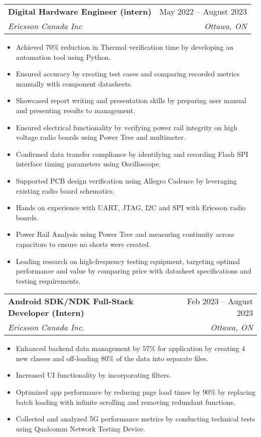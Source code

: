 \documentclass[A4,10pt]{article}
\makeatletter
\newcommand{\resumeItem}[1]{
  \item\small{
    {#1 \vspace{-2pt}}
  }
}
\newcommand{\resumeSubheading}[4]{
  \vspace{-2pt}\item
    \begin{tabular*}{0.97\textwidth}[t]{l@{\extracolsep{\fill}}r}
      \textbf{#1} & #2 \\
      \textit{\small#3} & \textit{\small #4} \\
    \end{tabular*}\vspace{-7pt}
}
\newcommand{\resumeSubSubheading}[2]{
    \item
    \begin{tabular*}{0.97\textwidth}{l@{\extracolsep{\fill}}r}
      \textit{\small#1} & \textit{\small #2} \\
    \end{tabular*}\vspace{-7pt}
}
\newcommand{\resumeSubHeadingListEnd}{\end{itemize}}
\newcommand{\resumeItemListStart}{\begin{itemize}}
\newcommand{\resumeItemListEnd}{\end{itemize}\vspace{-5pt}}
\makeatother
\begin{document}
    \resumeSubheading
      {Digital Hardware Engineer (intern)}{May 2022 -- August 2023}
      {Ericsson Canada Inc}{Ottawa, ON}
      \resumeItemListStart
        \resumeItem{Achieved 70\% reduction in Thermal verification time by developing an automation tool using Python.}
        \resumeItem{Ensured accuracy by creating test cases and comparing recorded metrics manually with component datasheets.}
        \resumeItem{Showcased report writing and presentation skills by preparing user manual and presenting results to management.}
        \resumeItem{Ensured electrical functionality by verifying power rail integrity on high voltage radio boards using Power Tree and multimeter.}
        \resumeItem{Confirmed data transfer compliance by identifying and recording Flash SPI interface timing parameters using Oscilloscope.}
        \resumeItem{Supported PCB design verification using Allegro Cadence by leveraging existing radio board schematics.}
        \resumeItem{Hands on experience with UART, JTAG, I2C and SPI with Ericsson radio boards.}
        \resumeItem{Power Rail Analysis using Power Tree and measuring continuity across capacitors to ensure no shorts were created.}
        \resumeItem{Leading research on high-frequency testing equipment, targeting optimal performance and value by comparing price with datasheet specifications and testing requirements.}
      \resumeItemListEnd
      


    \resumeSubheading
      {Android SDK/NDK Full-Stack Developer (Intern)}{Feb 2023 -- August 2023}
      {Ericsson Canada Inc.}{Ottawa, ON}
      \resumeItemListStart
        \resumeItem{Enhanced backend data management by 57\% for application by creating 4 new classes and off-loading 80\% of the data into separate files.}
        \resumeItem{Increased UI functionality by incorporating filters.}
        \resumeItem{Optimized app performance by reducing page load times by 90\% by replacing batch loading with infinite scrolling and removing redundant functions.}
        \resumeItem{Collected and analyzed 5G performance metrics by conducting technical tests using Qualcomm Network Testing Device.}
      \resumeItemListEnd
\end{document}
